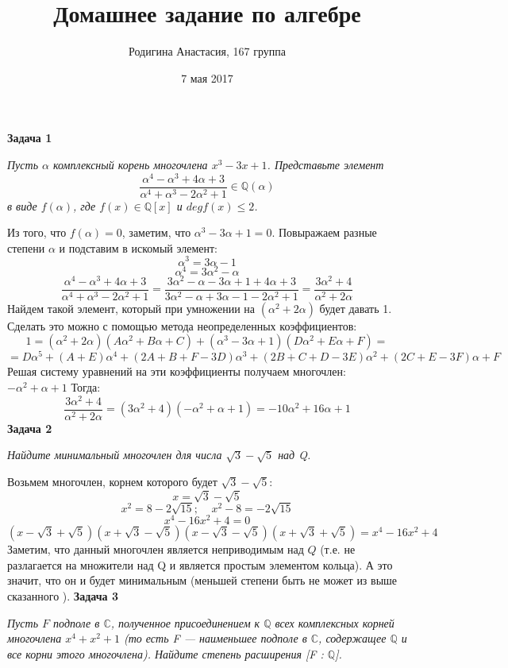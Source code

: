 \documentclass{article}
\title{Домашнее задание по алгебре}
\author{Родигина Анастасия, 167 группа}
\date{7 мая  2017}
\begin{document}
            

\maketitle  
 \noindent \textbf{Задача 1}
\begin{center} 
\textit{Пусть $\alpha$   комплексный корень многочлена $x^3 - 3x + 1$. Представьте элемент
$$\frac{\alpha^4 -\alpha^3 +4\alpha+3}{\alpha^4 +\alpha^3 -2\alpha^2 +1}\in \mathbb{Q}(\alpha)$$
 в виде  $f (\alpha)$, где $f (x) \in \mathbb{Q}[x]$ и $deg f (x) \leq2$.}
\end{center}
Из того, что $f (\alpha)=0$, заметим, что $\alpha^3-3\alpha+1=0$. Повыражаем разные степени $\alpha$ и подставим в искомый элемент:
$$\alpha^3=3\alpha-1$$
$$\alpha^4=3\alpha^2-\alpha$$
$$\frac{\alpha^4 -\alpha^3 +4\alpha+3}{\alpha^4 +\alpha^3 -2\alpha^2 +1}=\frac{3\alpha^2-\alpha-3\alpha+1+4\alpha+3}{3\alpha^2-\alpha+3\alpha-1-2\alpha^2+1}=\frac{3\alpha^2+4}{\alpha^2+2\alpha}$$
Найдем такой элемент, который при умножении на $(\alpha^2+2\alpha)$ будет давать 1. Сделать это можно с помощью метода неопределенных коэффициентов:
$$1=(\alpha^2+2\alpha)(A\alpha^2+B\alpha+C)+(\alpha^3-3\alpha+1)(D\alpha^2+E\alpha+F)=$$$$=D\alpha^5+(A+E)\alpha^4+(2A+B+F-3D)\alpha^3+(2B+C+D-3E)\alpha^2+(2C+E-3F)\alpha + F$$
Решая систему уравнений на эти коэффициенты получаем многочлен: $-\alpha^2+\alpha+1$
Тогда:
$$\frac{3\alpha^2+4}{\alpha^2+2\alpha}=(3\alpha^2+4)(-\alpha^2+\alpha+1)=-10\alpha^2+16\alpha+1$$
\newline
\newline
\textbf{Задача 2}
\begin{center}
\textit{Найдите минимальный многочлен для числа $\sqrt{3} - \sqrt{5}$ над Q.}
\end{center}
Возьмем многочлен, корнем которого будет $\sqrt{3} - \sqrt{5}$:
$$x=\sqrt{3} - \sqrt{5}$$
$$x^2=8-2\sqrt{15};~~~~~ x^2-8=-2\sqrt{15}$$
$$x^4-16x^2+4=0$$
$$(x-\sqrt{3} + \sqrt{5})(x+\sqrt{3} - \sqrt{5})(x-\sqrt{3} - \sqrt{5})(x+\sqrt{3} + \sqrt{5})=x^4-16x^2+4$$
Заметим, что данный многочлен является неприводимым над $Q$ (т.е. не разлагается на множители над Q и является простым элементом кольца). А это значит, что он и будет минимальным (меньшей степени быть не может из выше сказанного ).
\newpage
\textbf{Задача 3}
\begin{center}
\textit{Пусть $F$   подполе в $\mathbb{C}$, полученное присоединением к $\mathbb{Q}$ всех комплексных корней многочлена
$x^4 + x^2 + 1$ (то есть F --- наименьшее подполе в $\mathbb{C}$, содержащее $\mathbb{Q}$ и все корни этого многочлена). Найдите степень расширения [F : $\mathbb{Q}$].} 
\end{center}
\end{document}
